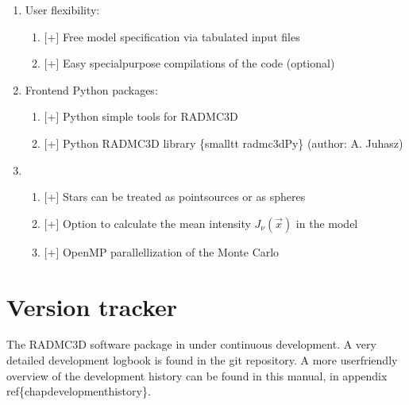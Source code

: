 \documentclass[letterpaper,10pt,english]{sphinxmanual}
\begin{document}
\begin{enumerate}
\begin{enumerate}
\item {} 
{[}+{]} Spectrum of user\sphinxhyphen{}specified sub\sphinxhyphen{}region (pointing)

\item {} 
{[}t{]} Specification of size and shape of a primary ‘beam’ for spectra

\end{enumerate}

\item {} 
User flexibility:
\begin{enumerate}
%
\item {} 
{[}+{]} Free model specification via tabulated input files

\item {} 
{[}+{]} Easy special\sphinxhyphen{}purpose compilations of the code (optional)

\end{enumerate}

\item {} 
Front\sphinxhyphen{}end Python packages:
\begin{enumerate}
%
\item {} 
{[}+{]} Python simple tools for RADMC\sphinxhyphen{}3D

\item {} 
{[}+{]} Python RADMC\sphinxhyphen{}3D library \{smalltt radmc3dPy\} (author: A. Juhasz)

\end{enumerate}

\item {} \begin{enumerate}
%
\item {} 
{[}+{]} Stars can be treated as point\sphinxhyphen{}sources or as spheres

\item {} 
{[}+{]} Option to calculate the mean intensity \(J_\nu(\vec x)\) in the model

\item {} 
{[}+{]} OpenMP parallellization of the Monte Carlo

\end{enumerate}

\end{enumerate}


\section{Version tracker}
\label{\detokenize{introduction:version-tracker}}
The RADMC\sphinxhyphen{}3D software package in under continuous development. A very
detailed development log\sphinxhyphen{}book is found in the git repository.
A more user\sphinxhyphen{}friendly overview of the development history can be
found in this manual, in appendix ref\{chap\sphinxhyphen{}development\sphinxhyphen{}history\}.
\end{document}
